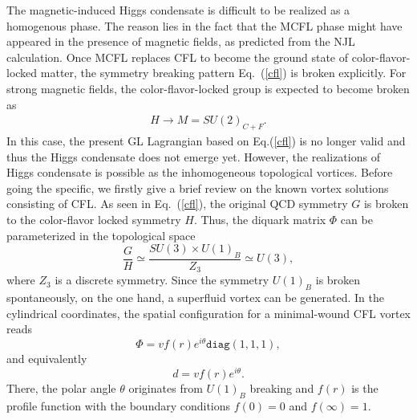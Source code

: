 \documentclass[prd, showpacs,nofootinbib,amsmath,amssymb]{revtex4}
\begin{document}
The magnetic-induced Higgs condensate is difficult to be realized as a homogenous phase.
The reason lies in the fact that the MCFL phase might have appeared in the presence of magnetic fields, as predicted from the NJL
calculation. 
Once MCFL replaces CFL to become the ground state of color-flavor-locked matter, the symmetry breaking pattern Eq.~(\ref{cfl}) is  broken explicitly. For strong magnetic fields, the color-flavor-locked group is expected to become broken as \cite{ferrer2007magnetic}
\begin{eqnarray}
H\rightarrow M=SU(2)_{C+F}.
\label{cfl2}\end{eqnarray}
In this case, the present GL Lagrangian based on Eq.(\ref{cfl}) is no longer valid and thus the Higgs condensate does not emerge yet.
However, the realizations of Higgs condensate is possible as the inhomogeneous topological vortices. 
Before going the specific, we firstly give a brief review on the known vortex solutions consisting of CFL.
As seen in Eq.~(\ref{cfl}), the original QCD symmetry $G$ is broken to
the color-flavor locked symmetry $H$.
Thus, the diquark matrix $\Phi$ can be parameterized in the
topological space
\begin{equation}
  \label{eq:cflvortexgroup}
  \frac{G}{H} \simeq \frac{SU(3) \times U(1)_B}{Z_3}  \simeq U(3),
\end{equation}
where $Z_3$ is a discrete symmetry.
Since the symmetry $U(1)_B$ is broken spontaneously, on the one hand, a superfluid vortex can be generated.
In the cylindrical coordinates, the spatial configuration for a minimal-wound CFL vortex reads
\begin{equation}
  \label{eq:bvortexphi}
\Phi =vf(r)e^{i \theta} \texttt{diag}(1,1,1),
\end{equation}
and equivalently
\begin{equation}
 d = vf(r)e^{i\theta}. \label{eq:bvortex}\end{equation}
There, the polar angle $\theta$ originates from $U(1)_B$ breaking and
$f(r)$ is the profile function with the boundary
conditions $f(0) = 0$ and $f(\infty) =1$.
\end{document}
